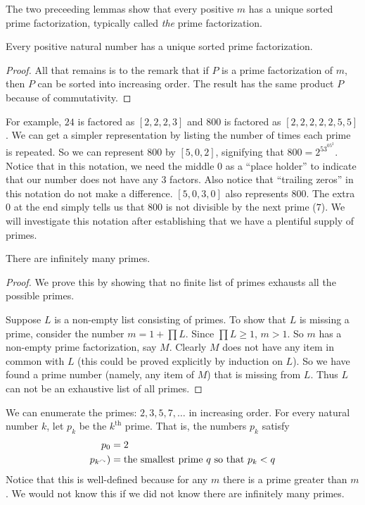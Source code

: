The two preceeding lemmas show that every positive $m$ has a unique sorted 
prime factorization, typically called \emph{the} prime factorization.

\begin{thm}
  Every positive natural number has a unique sorted prime factorization.

  \begin{proof}
   All that remains is to the remark that if $P$ is a prime factorization of $m$,
   then $P$ can be sorted into increasing order. The result has the same product
   $P$ because of commutativity.  
  \end{proof}
\end{thm}

For example, $24$ is factored as $[2,2,2,3]$ and $800$ is factored as $[2,2,2,2,2,5,5]$.
We can get a simpler representation by listing the number of times each prime is repeated.
So we can represent $800$ by $[5,0,2]$, signifying that $800 = 2^53^05^2$. Notice that in
this notation, we need the middle $0$ as a ``place holder'' to indicate that our number does
not have any $3$ factors. Also notice that ``trailing zeros'' in this notation do not make a difference.
$[5,0,3,0]$ also represents $800$. The extra $0$ at the end simply tells us that $800$ is not
divisible by the next prime ($7$). We will investigate this notation after establishing that
we have a plentiful supply of primes.

\begin{thm}
There are infinitely many primes.

\begin{proof}
We prove this by showing that no finite list of primes exhausts all
the possible primes.

Suppose $L$ is a non-empty list consisting of primes. 
To show that $L$ is missing a prime, consider the number $m=1 + \prod L$.
Since $\prod L\geq 1$, $m > 1$. So $m$ has a non-empty prime factorization, say $M$.
Clearly $M$ does not have any item in common with $L$ (this could be proved explicitly
by induction on $L$).
So we have found a prime number (namely, any item of $M$) that is missing from $L$.
Thus $L$ can not be an exhaustive list of all primes.
\end{proof}
\end{thm}

\begin{defn}
We can enumerate the primes: $2,3,5,7,\ldots$ in increasing order. For every natural number $k$, let $p_k$ be the $k^{\text{th}}$ prime. That is, the numbers $p_k$ satisfy
\begin{align*}
  p_0 &= 2\\
  p_{k^\curvearrowright}) &= \text{the smallest prime $q$ so that $p_k<q$}
\end{align*}
Notice that this is well-defined because for any $m$ there is a prime greater than $m$.
We would not know this if we did not know there are infinitely many primes.
\end{defn}

